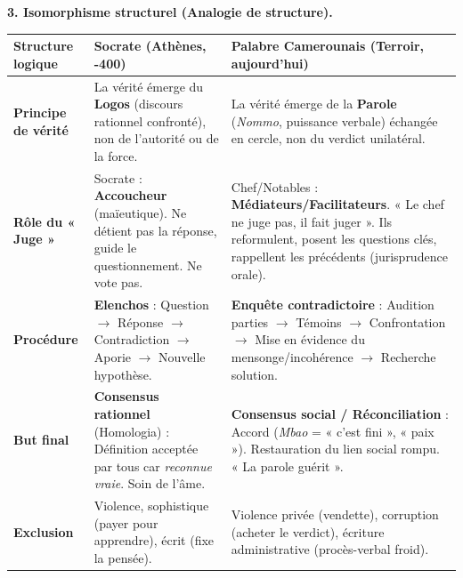 \documentclass[11pt]{article}
\begin{document}
\begin{exoresolu}
\textbf{3. Isomorphisme structurel (Analogie de structure).}

\begin{center}
\begin{tabularx}{\linewidth}{|l|X|X|}
\hline
\rowcolor{popblueL}
\textbf{Structure logique} & \textbf{Socrate (Athènes, -400)} & \textbf{Palabre Camerounais (Terroir, aujourd'hui)} \\
\hline
\textbf{Principe de vérité} & La vérité émerge du \textbf{Logos} (discours rationnel confronté), non de l'autorité ou de la force. & La vérité émerge de la \textbf{Parole} (\emph{Nommo}, puissance verbale) échangée en cercle, non du verdict unilatéral. \\
\hline
\textbf{Rôle du « Juge »} & Socrate : \textbf{Accoucheur} (maïeutique). Ne détient pas la réponse, guide le questionnement. Ne vote pas. & Chef/Notables : \textbf{Médiateurs/Facilitateurs}. « Le chef ne juge pas, il fait juger ». Ils reformulent, posent les questions clés, rappellent les précédents (jurisprudence orale). \\
\hline
\textbf{Procédure} & \textbf{Elenchos} : Question $\rightarrow$ Réponse $\rightarrow$ Contradiction $\rightarrow$ Aporie $\rightarrow$ Nouvelle hypothèse. & \textbf{Enquête contradictoire} : Audition parties $\rightarrow$ Témoins $\rightarrow$ Confrontation $\rightarrow$ Mise en évidence du mensonge/incohérence $\rightarrow$ Recherche solution. \\
\hline
\textbf{But final} & \textbf{Consensus rationnel} (Homologia) : Définition acceptée par tous car \emph{reconnue vraie}. Soin de l'âme. & \textbf{Consensus social / Réconciliation} : Accord (\emph{Mbao} = « c'est fini », « paix »). Restauration du lien social rompu. « La parole guérit ». \\
\hline
\textbf{Exclusion} & Violence, sophistique (payer pour apprendre), écrit (fixe la pensée). & Violence privée (vendette), corruption (acheter le verdict), écriture administrative (procès-verbal froid). \\
\hline
\end{tabularx}
\end{center}


\end{exoresolu}
\end{document}
